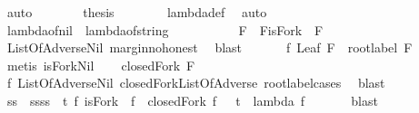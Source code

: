 \begin{isabellebody}
\ auto\isanewline
\ \ \ \ \isamarkupfalse%
\ \isamarkupfalse%
\ {\isacharquery}thesis\isanewline
\ \ \ \ \ \ \isamarkupfalse%
\ lambda{\isacharunderscore}def\ \isamarkupfalse%
\ auto\isanewline
\ \isamarkupfalse%
\isanewline
{}\isamarkupfalse%
%
\endisatagproof
{\isafoldproof}%
%
\isadelimproof
\ \isanewline
%
\endisadelimproof
\isanewline
{}\isamarkupfalse%
\ lambda{\isacharunderscore}of{\isacharunderscore}nil\ {\isacharcolon}\ {\isachardoublequoteopen}lambda{\isacharunderscore}of{\isacharunderscore}string\ {\isacharbrackleft}{\isacharbrackright}\ {\isacharequal}\ {}{\isachardoublequoteclose}\ \ \isanewline
%
\isadelimproof
%
\endisadelimproof
%
\isatagproof
{}\isamarkupfalse%
\ {\isacharminus}\isanewline
\ \ \isamarkupfalse%
\ F\ \ F{\isacharcolon}{\isachardoublequoteopen}isFork\ {\isacharbrackleft}{\isacharbrackright}\ F{\isachardoublequoteclose}\isanewline
\ \ \ \ \isamarkupfalse%
\ ListOfAdverse{\isachardot}Nil\ margin{\isacharunderscore}no{\isacharunderscore}honest\ \isamarkupfalse%
\ blast\ \isanewline
\ \ \isamarkupfalse%
\ \isamarkupfalse%
\ f{}{\isacharcolon}\ {\isachardoublequoteopen}Leaf\ F\ {\isasymand}\ root{\isacharunderscore}label{\isacharunderscore}{}\ F{\isachardoublequoteclose}\ \isanewline
\ \ \ \ \isamarkupfalse%
\ {\isacharparenleft}metis\ isFork{\isacharunderscore}Nil{\isacharparenright}\isanewline
\ \ \isamarkupfalse%
\ {\isachardoublequoteopen}closedFork\ F\ {\isacharbrackleft}{\isacharbrackright}{\isachardoublequoteclose}\ \isanewline
\ \ \ \ \isamarkupfalse%
\ f{}\ ListOfAdverse{\isachardot}Nil\ closedFork{\isacharunderscore}ListOfAdverse\ root{\isacharunderscore}label{\isacharunderscore}{}{\isachardot}cases\ \isamarkupfalse%
\ blast\ \ \ \ \ \ \isanewline
\ \ \isamarkupfalse%
\ ss\ \ ss{\isacharcolon}{\isachardoublequoteopen}ss\ {\isacharequal}\ {\isacharbraceleft}t{\isachardot}\ {\isasymexists}f{\isachardot}\ isFork\ {\isacharbrackleft}{\isacharbrackright}\ f\ {\isasymand}\ closedFork\ f\ {\isacharbrackleft}{\isacharbrackright}\ {\isasymand}\ t\ {\isacharequal}\ lambda\ f\ {\isacharbrackleft}{\isacharbrackright}{\isacharbraceright}{\isachardoublequoteclose}\isanewline
\ \ \ \ \isamarkupfalse%
\ blast\ \isanewline
\ \ \isamarkupfalse%

\end{isabellebody}
